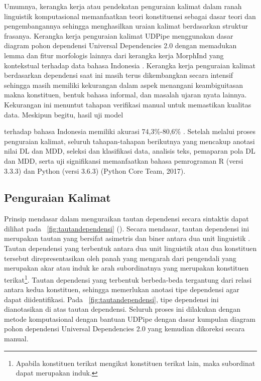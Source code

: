 Umumnya, kerangka kerja atau pendekatan penguraian kalimat dalam ranah linguistik komputasional memanfaatkan teori konstituensi sebagai dasar teori dan pengembangannya sehingga menghasilkan uraian kalimat berdasarkan struktur frasanya. Kerangka kerja penguraian kalimat UDPipe menggunakan dasar diagram pohon dependensi Universal Dependencies 2.0 \citep{nivre2017universal} dengan memadukan lemma dan fitur morfologis lainnya dari kerangka kerja MorphInd yang kontekstual terhadap data bahasa Indonesia \citep{larasati2011indonesian}. Kerangka kerja penguraian kalimat berdasarkan dependensi saat ini masih terus dikembangkan secara intensif sehingga masih memiliki kekurangan dalam aspek menangani keambiguitasan makna konstituen, bentuk bahasa informal, dan masalah ujaran nyata lainnya. Kekurangan ini menuntut tahapan verifikasi manual untuk memastikan kualitas data. Meskipun begitu, hasil uji model 

 terhadap bahasa Indonesia memiliki akurasi 74,3\%-80,6\% \citep{udpipe:2017}. Setelah melalui proses penguraian kalimat, seluruh tahapan-tahapan berikutnya yang mencakup anotasi nilai DL dan MDD, seleksi dan klasifikasi data, analisis teks, pemaparan pola DL dan MDD, serta uji signifikansi memanfaatkan bahasa pemrograman R (versi 3.3.3) \citep{r2017project} dan Python (versi 3.6.3) (Python Core Team, 2017).

\subsection{Penguraian Kalimat}
Prinsip mendasar dalam menguraikan tautan dependensi secara sintaktis dapat dilihat pada \pic~\ref{fig:tautandependensi} (\citealp{tesniere1959elements, hudson1984word, liu2008dependency, liu2017dependency}). Secara mendasar, tautan dependensi ini merupakan tautan yang bersifat asimetris dan biner antara dua unit linguistik \citep{tesniere1959elements}. Tautan dependensi yang terbentuk antara dua unit linguistik atau dua konstituen tersebut direpresentasikan oleh panah yang mengarah dari pengendali yang merupakan akar atau induk ke arah subordinatnya yang merupakan konstituen terikat\footnote{Apabila konstituen terikat mengikat konstituen terikat lain, maka subordinat dapat merupakan induk.}. Tautan dependensi yang terbentuk berbeda-beda tergantung dari relasi antara kedua konstituen, sehingga memerlukan anotasi tipe dependensi agar dapat diidentifikasi. Pada \pic~\ref{fig:tautandependensi}, tipe dependensi ini dianotasikan di atas tautan dependensi. Seluruh proses ini dilakukan dengan metode komputasional dengan bantuan UDPipe \citep{udpipe2017} dengan dasar kumpulan diagram pohon dependensi Universal Dependencies 2.0 \citep{nivre2017universal} yang kemudian dikoreksi secara manual.

